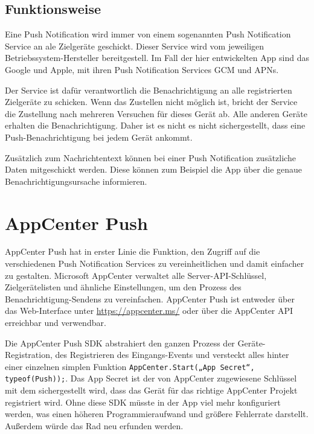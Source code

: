 \subsection{Funktionsweise}
Eine Push Notification wird immer von einem sogenannten Push Notification Service an ale Zielgeräte geschickt.
Dieser Service wird vom jeweiligen Betriebssystem-Hersteller bereitgestell.
Im Fall der hier entwickelten App sind das Google und Apple, mit ihren Push Notification Services GCM und APNs.\par

Der Service ist dafür verantwortlich die Benachrichtigung an alle registrierten Zielgeräte zu schicken.
Wenn das Zustellen nicht möglich ist, bricht der Service die Zustellung nach mehreren Versuchen für dieses Gerät ab.
Alle anderen Geräte erhalten die Benachrichtigung.
Daher ist es nicht es nicht sichergestellt, dass eine Push-Benachrichtigung bei jedem Gerät ankommt.\par

Zusätzlich zum Nachrichtentext können bei einer Push Notification zusätzliche Daten mitgeschickt werden. Diese können zum Beispiel die App über die genaue Benachrichtigungsursache informieren.

\section{AppCenter Push}
AppCenter Push hat in erster Linie die Funktion, den Zugriff auf die verschiedenen Push Notification Services zu vereinheitlichen und damit einfacher zu gestalten.
Microsoft AppCenter verwaltet alle Server-API-Schlüssel, Zielgerätelisten und ähnliche Einstellungen, um den Prozess des Benachrichtigung-Sendens zu vereinfachen.
AppCenter Push ist entweder über das Web-Interface unter \url{https://appcenter.ms/} oder über die AppCenter API erreichbar und verwendbar.\par

Die AppCenter Push SDK abstrahiert den ganzen Prozess der Geräte-Registration, des Registrieren des Eingangs-Events und versteckt alles hinter einer einzelnen simplen Funktion \texttt{AppCenter.Start(„{App Secret}“, typeof(Push));}. Das App Secret ist der von AppCenter zugewiesene Schlüssel mit dem sichergestellt wird, dass das Gerät für das richtige AppCenter Projekt registriert wird.
Ohne diese SDK müsste in der App viel mehr konfiguriert werden, was einen höheren Programmieraufwand und größere Fehlerrate darstellt. Außerdem würde das Rad neu erfunden werden.\par

